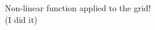 \documentclass[preview]{standalone}
\begin{document}
\begin{center}
Non-linear function applied to the grid! \\ (I did it)
\end{center}
\end{document}
